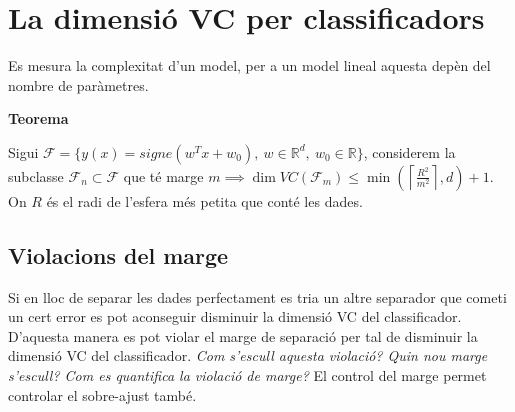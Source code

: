\documentclass[a4paper]{article}
\begin{document}
\section{La dimensió VC per classificadors}
Es mesura la complexitat d'un model, per a un model lineal aquesta depèn del nombre de paràmetres. 

\textbf{Teorema}

Sigui $\mathcal{F} = \{ y(x) = signe(w^T x + w_0), \ w \in \mathbb{R}^d, \ w_0 \in \mathbb{R} \}$, considerem la subclasse $\mathcal{F}_n \subset \mathcal{F}$ que té marge $m \implies \dim VC(\mathcal{F}_m) \le \min \left( \left\lceil \frac{R^2}{m^2} \right\rceil, d \right) + 1$. On $R$ és el radi de l'esfera més petita que conté les dades. 

\subsection{Violacions del marge}


\begin{figure}[H]
	\centering
\end{figure}


Si en lloc de separar les dades perfectament es tria un altre separador que cometi un cert error es pot aconseguir disminuir la dimensió VC del classificador. D'aquesta manera es pot violar el marge de separació per tal de disminuir la dimensió VC del classificador. \emph{Com s'escull aquesta violació? Quin nou marge s'escull? Com es quantifica la violació de marge?} El control del marge permet controlar el sobre-ajust també. 
\end{document}
